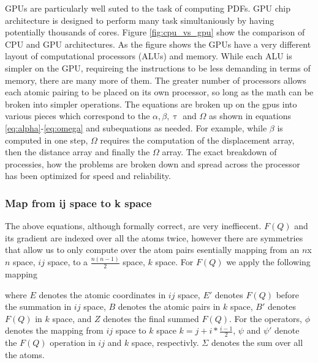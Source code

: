 GPUs are particularly well suted to the task of computing PDFs.
GPU chip architecture is designed to perform many task simultaniously by having potentially thousands of cores.
Figure \ref{fig:cpu_vs_gpu} show the comparison of CPU and GPU architectures.
As the figure shows the GPUs have a very different layout of computational processors (ALUs) and memory.
While each ALU is simpler on the GPU, requireing the instructions to be less demanding in terms of memory, there are many more of them.
The greater number of processors allows each atomic pairing to be placed on its own processor, so long as the math can be broken into simpler operations.
The equations are broken up on the gpus into various pieces which correspond to the $\alpha, \beta, \uptau$ and $\Omega$ as shown in equations \ref{eq:alpha}-\ref{eq:omega} and subequations as needed.
For example, while $\beta$ is computed in one step, $\Omega$ requires the computation of the displacement array, then the distance array and finally the $\Omega$ array.
The exact breakdown of processies, how the problems are broken down and spread across the processor has been optimized for speed and reliability.

\subsubsection{Map from ij space to k space}
The above equations, although formally correct, are very ineffiecent. $F(Q)$ and its gradient are indexed over all the atoms twice, however there are symmetries that allow us to only compute over the atom pairs esentially mapping from an $n$x$n$ space, $ij$ space, to a $\frac{n(n-1)}{2}$ space, $k$ space.
For $F(Q)$ we apply the following mapping
\begin{figure}[!ht]
\begin{center}
\end{center}
\end{figure}
where $E$ denotes the atomic coordinates in $ij$ space, $E'$ denotes $F(Q)$ before the summation in $ij$ space, $B$ denotes the atomic pairs in $k$ space, $B'$ denotes $F(Q)$ in $k$ space, and $Z$ denotes the final summed $F(Q)$.  For the operators, $\phi$ denotes the mapping from $ij$ space to $k$ space $k = j + i * \frac{i - 1}{2}$, $\psi$ and $\psi'$ denote the $F(Q)$ operation in $ij$ and $k$ space, respectivly. $\Sigma$ denotes the sum over all the atoms.  

